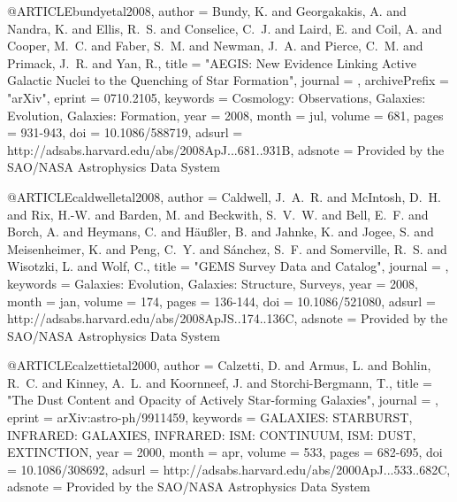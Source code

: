 {{{{{{{{{{{{@ARTICLE{bundyetal2008,
   author = {{Bundy}, K. and {Georgakakis}, A. and {Nandra}, K. and {Ellis}, R.~S. and 
	{Conselice}, C.~J. and {Laird}, E. and {Coil}, A. and {Cooper}, M.~C. and 
	{Faber}, S.~M. and {Newman}, J.~A. and {Pierce}, C.~M. and {Primack}, J.~R. and 
	{Yan}, R.},
    title = "{AEGIS: New Evidence Linking Active Galactic Nuclei to the Quenching of Star Formation}",
  journal = {\apj},
archivePrefix = "arXiv",
   eprint = {0710.2105},
 keywords = {Cosmology: Observations, Galaxies: Evolution, Galaxies: Formation},
     year = 2008,
    month = jul,
   volume = 681,
    pages = {931-943},
      doi = {10.1086/588719},
   adsurl = {http://adsabs.harvard.edu/abs/2008ApJ...681..931B},
  adsnote = {Provided by the SAO/NASA Astrophysics Data System}
}


@ARTICLE{caldwelletal2008,
   author = {{Caldwell}, J.~A.~R. and {McIntosh}, D.~H. and {Rix}, H.-W. and 
	{Barden}, M. and {Beckwith}, S.~V.~W. and {Bell}, E.~F. and 
	{Borch}, A. and {Heymans}, C. and {H{\"a}u{\ss}ler}, B. and 
	{Jahnke}, K. and {Jogee}, S. and {Meisenheimer}, K. and {Peng}, C.~Y. and 
	{S{\'a}nchez}, S.~F. and {Somerville}, R.~S. and {Wisotzki}, L. and 
	{Wolf}, C.},
    title = "{GEMS Survey Data and Catalog}",
  journal = {\apjs},
 keywords = {Galaxies: Evolution, Galaxies: Structure, Surveys},
     year = 2008,
    month = jan,
   volume = 174,
    pages = {136-144},
      doi = {10.1086/521080},
   adsurl = {http://adsabs.harvard.edu/abs/2008ApJS..174..136C},
  adsnote = {Provided by the SAO/NASA Astrophysics Data System}
}


@ARTICLE{calzettietal2000,
   author = {{Calzetti}, D. and {Armus}, L. and {Bohlin}, R.~C. and {Kinney}, A.~L. and 
	{Koornneef}, J. and {Storchi-Bergmann}, T.},
    title = "{The Dust Content and Opacity of Actively Star-forming Galaxies}",
  journal = {\apj},
   eprint = {arXiv:astro-ph/9911459},
 keywords = {GALAXIES: STARBURST, INFRARED: GALAXIES, INFRARED: ISM: CONTINUUM, ISM: DUST, EXTINCTION},
     year = 2000,
    month = apr,
   volume = 533,
    pages = {682-695},
      doi = {10.1086/308692},
   adsurl = {http://adsabs.harvard.edu/abs/2000ApJ...533..682C},
  adsnote = {Provided by the SAO/NASA Astrophysics Data System}
}

}}}}}}}}}}}}

